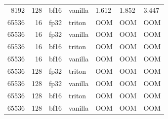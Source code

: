 \begin{table}[h]
\begin{tabular}{rrrllll}
8192 & 128 & bf16 & vanilla & 1.612 & 1.852 & 3.447 \\
[3pt]
65536 & 16 & fp32 & triton & OOM & OOM & OOM \\
65536 & 16 & fp32 & vanilla & OOM & OOM & OOM \\
[3pt]
65536 & 16 & bf16 & triton & OOM & OOM & OOM \\
65536 & 16 & bf16 & vanilla & OOM & OOM & OOM \\
[3pt]
65536 & 128 & fp32 & triton & OOM & OOM & OOM \\
65536 & 128 & fp32 & vanilla & OOM & OOM & OOM \\
[3pt]
65536 & 128 & bf16 & triton & OOM & OOM & OOM \\
65536 & 128 & bf16 & vanilla & OOM & OOM & OOM \\
\bottomrule
\end{tabular}
\end{table}